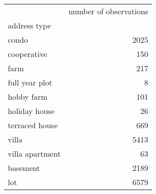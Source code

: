 \begin{tabular}{lr}
 & number of observations \\
address type &  \\
condo & 2025 \\
cooperative & 150 \\
farm & 217 \\
full year plot & 8 \\
hobby farm & 101 \\
holiday house & 26 \\
terraced house & 669 \\
villa & 5413 \\
villa apartment & 63 \\
basement & 2189 \\
lot & 6579 \\
\end{tabular}
